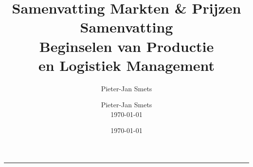 \documentclass[10pt,a4paper]{article}
\author{Pieter-Jan Smets}
\title{Samenvatting Markten & Prijzen}
\date{\today}
\title{	\fontsize{40}{60}\selectfont
			\vspace*{0.7cm}
			\hfill Samenvatting 		\\[0.8cm]
			\hfill Beginselen van Productie\\[0.8cm]%
            \hfill en Logistiek Management\\[0.8cm]
		}
\author{
		\hfill Pieter-Jan Smets\\
		\hfill \today \\
}
\makeatletter
\newcommand{\HRule}[1]{\hfill \rule{0.2\linewidth}{#1}} 	%
\def\printtitle{%
    {\centering \@title\par}}
\def\printauthor{%
    {\centering \large \@author}}
\makeatother
\begin{document}
\thispagestyle{empty}				%

\colorbox{grey}{
	\parbox[t]{1.0\linewidth}{
		\printtitle
		\vspace*{0.7cm}
	}
}

  	\vfill
\printauthor								%
\HRule{1pt}
\clearpage


\tableofcontents
\newpage

\listoffigures
\newpage



\end{document}
